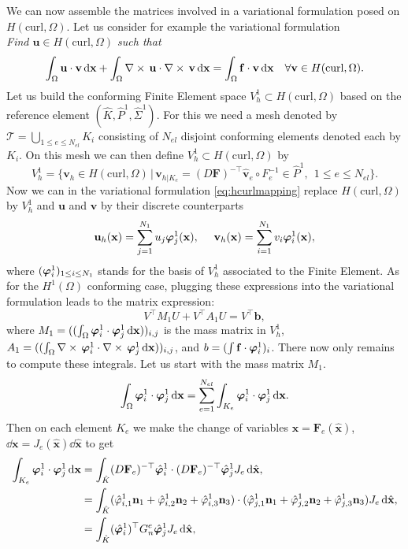 We can now assemble the matrices involved in a variational formulation posed on $ H(\textrm{curl}, \Omega)$. Let us consider for example the variational formulation\\
\textit{ Find $\mathbf{u}\in H(\textrm{curl}, \Omega)$ such that}
\begin{equation}\label{eq:hcurlmapping}
\int_\Omega \mathbf{u}\cdot \mathbf{v}\,{\rm d} \mathbf{x} + \int_\Omega \nabla\times\,\mathbf{u}\cdot \nabla\times\,\mathbf{v}\,{\rm d} \mathbf{x} = \int_\Omega \mathbf{f}\cdot \mathbf{v}\,{\rm d} \mathbf{x} \quad\forall \mathbf{v}\in H(\textrm{curl}, \Omega).
\end{equation}
Let us build the conforming Finite Element space $V^1_h\subset H(\textrm{curl}, \Omega)$ based on the reference element $(\hat{K},\hat{P}^1,\hat{\Sigma}^1)$. For this we need a mesh denoted by 
$\mathcal{T}=\bigcup_{1\leq e \leq N_{el}} K_i$ 
consisting of $N_{el}$ disjoint conforming elements denoted each by $K_i$.
On this mesh we can then define $V^1_h \subset H(\textrm{curl}, \Omega)$ by
$$V^1_h = \{ \mathbf{v}_h\in H(\textrm{curl}, \Omega) \,|\, \mathbf{v}_{h|K_e}= (D \mathbf{F})^{-\top}\hat{\mathbf{v}}_e \circ F_e^{-1} \in \hat{P}^1, ~~ 1\leq e\leq N_{el}  \}.$$
Now we can in the variational formulation \eqref{eq:hcurlmapping} replace  $ H(\textrm{curl}, \Omega)$ by $V^1_h$ and $ \mathbf{u}$ and $\mathbf{v}$ by their discrete counterparts 
$$ \mathbf{u}_h ( \mathbf{x})= \sum_{j=1}^{N_1} u_j \boldsymbol{\varphi}^1_j ( \mathbf{x}), ~~~~
 \mathbf{v}_h ( \mathbf{x})= \sum_{i=1}^{N_1} v_i \boldsymbol{\varphi}^1_i ( \mathbf{x}),$$
where $ ( \boldsymbol{\varphi}^1_i)_{1\leq i \leq N_1}$ stands for the basis of $V^1_h$ associated to the Finite Element. As for the $ H^1(\Omega)$ conforming case, plugging these expressions into the variational formulation leads to the matrix expression:
$$V^\top M_1 U + V^\top A_1 U = V^\top \mathbf{b},$$
where $M_1= ((\int_\Omega \boldsymbol{\varphi}^1_i\cdot \boldsymbol{\varphi}^1_j \,{\rm d} \mathbf{x}))_{i,j}$ is the mass matrix in $V^1_h$,
$A_1 =  ((\int_\Omega \nabla\times\,\boldsymbol{\varphi}^1_i\cdot \nabla\times\,\boldsymbol{\varphi}^1_j \,{\rm d} \mathbf{x}))_{i,j}$, and 
$b= (\int \mathbf{f}\cdot \boldsymbol{\varphi}^1_i)_i$. There now only remains to compute these integrals. Let us start with the mass matrix  $M_1$.
$$ \int_\Omega \boldsymbol{\varphi}^1_i\cdot \boldsymbol{\varphi}^1_j \,{\rm d} \mathbf{x} = \sum_{e=1}^{N_{el}}
 \int_{K_e} \boldsymbol{\varphi}^1_i\cdot \boldsymbol{\varphi}^1_j \,{\rm d} \mathbf{x}.$$
 Then on each element $K_e$ we make the change of variables $ \mathbf{x}= \mathbf{F}_e(\hat{\mathbf{x}})$,
 $ \dd\mathbf{x}= J_e( \hat{\mathbf{x}})\dd \hat{\mathbf{x}}$ to get
\begin{align*}
   \int_{K_e} \boldsymbol{\varphi}^1_i\cdot \boldsymbol{\varphi}^1_j \,{\rm d} \mathbf{x} &=
 \int_{\hat{K}} (D \mathbf{F}_e)^{-\top}\hat{\boldsymbol{\varphi}}^1_i\cdot  (D \mathbf{F}_e)^{-\top} \hat{\boldsymbol{\varphi}}^1_j J_e\,{\rm d} \hat{\mathbf{x}}, \\
 &= \int_{\hat{K}} ( \hat{\varphi}^1_{i,1} \mathbf{n}_1 +\hat{\varphi}^1_{i,2} \mathbf{n}_2 +\hat{\varphi}^1_{i,3} \mathbf{n}_3 )
 \cdot ( \hat{\varphi}_{j,1}^1 \mathbf{n}_1 +\hat{\varphi}_{j,2}^1 \mathbf{n}_2 +\hat{\varphi}^1_{j,3} \mathbf{n}_3 )
 J_e\,{\rm d} \hat{\mathbf{x}},\\
 &=  \int_{\hat{K}} (\hat{\boldsymbol{\varphi}}^1_i)^\top G^e_n \hat{\boldsymbol{\varphi}}^1_j J_e\,{\rm d} \hat{\mathbf{x}},
 \end{align*}
